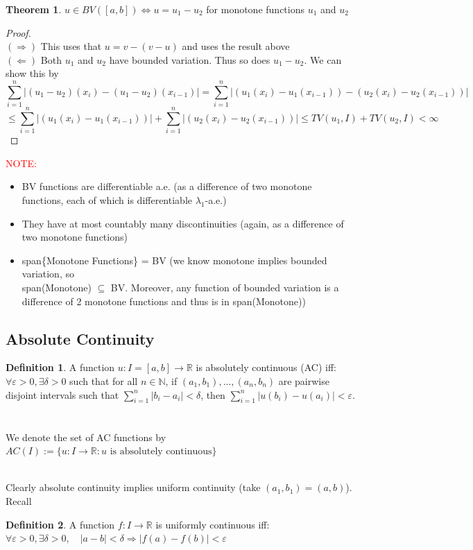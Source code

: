 \documentclass[11pt,a4paper]{article}
\theoremstyle{definition}
\newtheorem{definition}{Definition}[section]
\newtheorem{theorem}{Theorem}[section]
\begin{document}
\begin{theorem}
    $u \in BV([a,b]) \iff  u = u_1-u_2$ for monotone functions $u_1$ and $u_2$
\end{theorem}
\begin{proof}~\\
    $(\Longrightarrow)$ This uses that $u = v - (v-u)$ and uses the result above
    ~\\\noindent
    $(\Longleftarrow)$ Both $u_1$ and $u_2$ have bounded variation. Thus so does $u_1 - u_2$. We can show this by 
    \[\sum \limits _{i=1}^n |(u_1-u_2)(x_i) - (u_1-u_2)(x_{i-1})| = \sum \limits _{i=1}^n |(u_1(x_i)-u_1(x_{i-1}))-(u_2(x_i) -u_2(x_{i-1}))| \]
    \[\le \sum \limits _{i=1}^n |(u_1(x_i)-u_1(x_{i-1}))| + \sum \limits _{i=1}^n |(u_2(x_i) -u_2(x_{i-1}))| \le TV(u_1, I) + TV(u_2, I)<\infty \]
\end{proof}
\noindent
\textcolor{red}{NOTE:}
\begin{itemize}
    \item BV functions are differentiable a.e. (as a difference of two monotone functions, each of which is differentiable $\lambda_1$-a.e.)
    \item They have at most countably many discontinuities (again, as a difference of two monotone functions)
    \item span\{Monotone Functions\} = BV (we know monotone implies bounded variation, so \\ span(Monotone) $\subseteq$ BV. Moreover, any function of bounded variation is a difference of 2 monotone functions and thus is in span(Monotone))
\end{itemize}


\subsection{Absolute Continuity}
\begin{definition}
    A function $u: I = [a,b] \to \mathbb{R}$ is absolutely continuous (AC) iff: \\ $\forall \varepsilon>0, \exists \delta >0$ such that for all $n\in \mathbb{N}$, if $(a_1, b_1),...,(a_n, b_n)$ are pairwise disjoint intervals such that $\sum \limits _{i=1}^n |b_i - a_i| < \delta$, then $\sum \limits _{i=1}^n |u(b_i) - u(a_i)| < \varepsilon$. ~\\~\\We denote the set of AC functions by $AC(I) := \{u:I \to \mathbb{R} : u \text{ is absolutely continuous}\}$
\end{definition}
~\\
Clearly absolute continuity implies uniform continuity (take $(a_1,b_1) = (a,b)$). Recall \begin{definition}
    A function $f: I \to \mathbb{R}$ is uniformly continuous iff: \\ $\forall \varepsilon > 0, \exists \delta > 0, \quad |a-b| < \delta \Rightarrow |f(a) - f(b)| < \varepsilon$
\end{definition}
\end{document}
